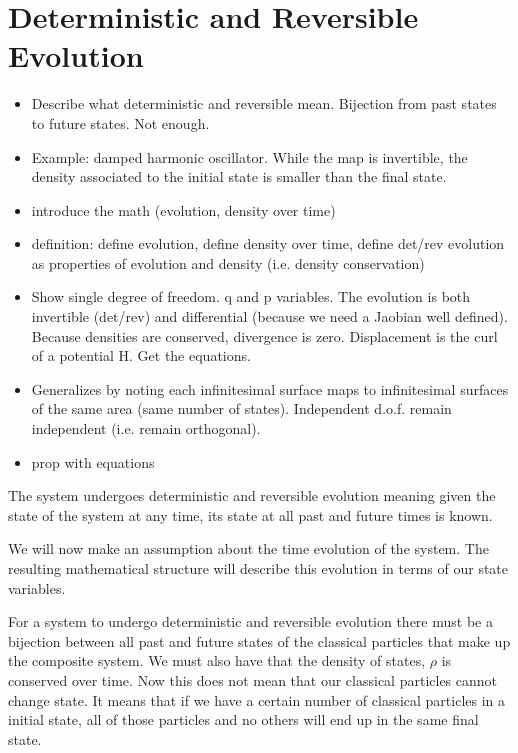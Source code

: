 \documentclass{article}
\begin{document}
\section{Deterministic and Reversible Evolution}

\begin{itemize}
	\item Describe what deterministic and reversible mean. Bijection from past states to future states. Not enough.
	
	\item Example: damped harmonic oscillator. While the map is invertible, the density associated to the initial state is smaller than the final state.
	
	\item introduce the math (evolution, density over time)
	
	\item definition: define evolution, define density over time, define det/rev evolution as properties of evolution and density (i.e. density conservation)
	
	\item Show single degree of freedom. q and p variables. The evolution is both invertible (det/rev) and differential (because we need a Jaobian well defined). Because densities are conserved, divergence is zero. Displacement is the curl of a potential H. Get the equations.
	
	\item Generalizes by noting each infinitesimal surface maps to infinitesimal surfaces of the same area (same number of states). Independent d.o.f. remain independent (i.e. remain orthogonal).
	
	\item prop with equations
	
\end{itemize}


\begin{assump}
	The system undergoes deterministic and reversible evolution meaning given the state of the system at any time, its state at all past and future times is known.
\end{assump}

	We will now make an assumption about the time evolution of the system. The resulting mathematical structure will describe this evolution in terms of our state variables.

	For a system to undergo deterministic and reversible evolution there must be a bijection between all past and future states of the classical particles that make up the composite system. We must also have that the density of states, $\rho$ is conserved over time. Now this does not mean that our classical particles cannot change state. It means that if we have a certain number of classical particles in a initial state, all of those particles and no others will end up in the same final state.
	
\end{document}
